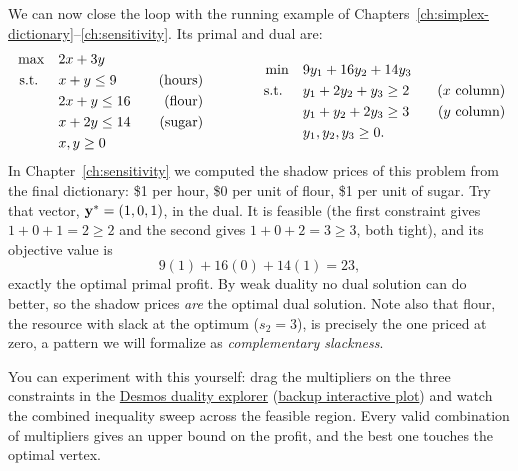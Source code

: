We can now close the loop with the running example of Chapters~\ref{ch:simplex-dictionary}--\ref{ch:sensitivity}. Its primal and dual are:
\[
\begin{aligned}
\max \quad & 2x + 3y \\
\mbox{ s.t. } \quad
& x + y \leq 9 \quad & \mbox{(hours)} \\
& 2x + y \leq 16 \quad & \mbox{(flour)} \\
& x + 2y \leq 14 \quad & \mbox{(sugar)} \\
& x, y \geq 0
\end{aligned}
\qquad\qquad
\begin{aligned}
\min \quad & 9y_1 + 16y_2 + 14y_3 \\
\mbox{ s.t. } \quad
& y_1 + 2y_2 + y_3 \geq 2 \quad & \mbox{($x$ column)} \\
& y_1 + y_2 + 2y_3 \geq 3 \quad & \mbox{($y$ column)} \\
& y_1, y_2, y_3 \geq 0.
\end{aligned}
\]
In Chapter~\ref{ch:sensitivity} we computed the shadow prices of this problem from the final dictionary: \$1 per hour, \$0 per unit of flour, \$1 per unit of sugar. Try that vector, $\mathbf{y}^* = (1, 0, 1)$, in the dual. It is feasible (the first constraint gives $1 + 0 + 1 = 2 \geq 2$ and the second gives $1 + 0 + 2 = 3 \geq 3$, both tight), and its objective value is
\[
9(1) + 16(0) + 14(1) = 23,
\]
exactly the optimal primal profit. By weak duality no dual solution can do better, so the shadow prices \emph{are} the optimal dual solution. Note also that flour, the resource with slack at the optimum ($s_2 = 3$), is precisely the one priced at zero, a pattern we will formalize as \emph{complementary slackness}.

You can experiment with this yourself: drag the multipliers on the three constraints in the \href{https://www.desmos.com/calculator/d2d5c861c3}{Desmos duality explorer} (\href{https://open-optimization.github.io/open-optimization-or-book/interactive-figures/lp-duality-explorer.html}{backup interactive plot}) and watch the combined inequality sweep across the feasible region. Every valid combination of multipliers gives an upper bound on the profit, and the best one touches the optimal vertex.

